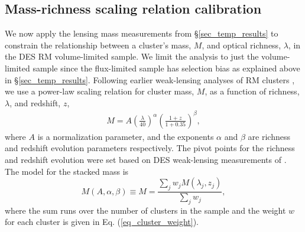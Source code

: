 \subsection{Mass-richness \ML{} scaling relation calibration}\label{sec_ML_scaling}

We now apply the lensing mass measurements from \S\ref{sec_temp_results} to constrain the relationship between a cluster's mass, $M$, and optical richness, $\lambda$, in the DES RM \whichyear{} volume-limited sample. 
We limit the analysis to just the volume-limited sample since the flux-limited sample has selection bias as explained above in \S\ref{sec_temp_results}.
Following earlier weak-lensing analyses of RM clusters \citep{simet18, melchoir17, mcclintock18}, we use a power-law scaling relation for cluster mass, $M$, as a function of richness, $\lambda$, and redshift, $z$,
\begin{eqnarray}
M = A \left(\frac{\lambda}{40}\right)^{\alpha} \left(\frac{1+z}{1+0.35}\right)^{\beta},
\label{eq_ML}
 \end{eqnarray}
 where $A$ is a normalization parameter, and the exponents $\alpha$ and $\beta$ are richness and redshift evolution parameters respectively. 
The pivot points for the richness and redshift evolution were set based on DES weak-lensing measurements of \cite{mcclintock18}.
The model for the stacked mass is 
\begin{equation}
M(A, \alpha, \beta) \equiv M = \frac{\sum_j w_j M(\lambda_{j}, z_{j})}{\sum_j w_j}, 
\label{eq_model_ML}
\end{equation}
where the sum runs over the number of clusters in the sample and the weight $w$ for each cluster is given in Eq. (\ref{eq_cluster_weight}).


